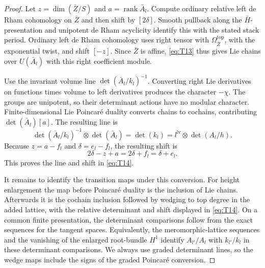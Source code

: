 \documentclass[11pt]{article}
\numberwithin{equation}{section}
\theoremstyle{definition}
\theoremstyle{remark}
\begin{document}
\begin{proof}
Let $z=\dim(\bar Z/S)$ and $a=\operatorname{rank}\bar A_l$.
Compute ordinary relative left de Rham cohomology on $\bar Z$ and
then shift by $[2\delta]$.  Smooth pullback along the
$\bar H$-presentation and unipotent de Rham acyclicity identify this
with the stated stack period.  Ordinary left de Rham cohomology uses
right tensor with $\Omega^{\mathrm{top}}_{\bar Z}$, with the
exponential twist, and shift $[-z]$.  Since $\bar Z$ is affine,
\eqref{eq:T13} thus gives Lie chains over $U(\bar A_l)$ with this
right coefficient module.

Use the invariant volume line
$\det(\bar A_l/k_l)^{-1}$.  Converting right Lie derivatives on
functions times volume to left derivatives produces the character
$-\chi$.  The groups are unipotent, so their determinant actions
have no modular character.  Finite-dimensional Lie Poincar\'e
duality converts chains to cochains, contributing
$\det(\bar A_l)[a]$.  The resulting line is
\[
 \det(\bar A_l/k_l)^{-1}\otimes\det(\bar A_l)
       =\det(k_l)
       =l^{\mathrm{lv}}\otimes\det(A_l/h).
\]
Because $z=a-f_l$ and $\delta=e_l-f_l$, the resulting shift is
\[
 2\delta-z+a=2\delta+f_l=\delta+e_l.
\]
This proves the line and shift in \eqref{eq:T14}.

It remains to identify the transition maps under this conversion.
For height enlargement the map before Poincar\'e duality is the
inclusion of Lie chains.  Afterwards it is the cochain inclusion
followed by wedging to top degree in the added lattice, with the
relative determinant and shift displayed in \eqref{eq:T14}.  On a
common finite presentation, the determinant comparisons follow from
the exact sequences for the tangent spaces.  Equivalently, the
meromorphic-lattice sequences and the vanishing of the enlarged
root-bundle $H^1$ identify $A_{l'}/A_l$ with $k_{l'}/k_l$ in these
determinant comparisons.  We always use graded determinant lines,
so the wedge maps include the signs of the graded Poincar\'e
conversion.


\end{proof}
\end{document}
